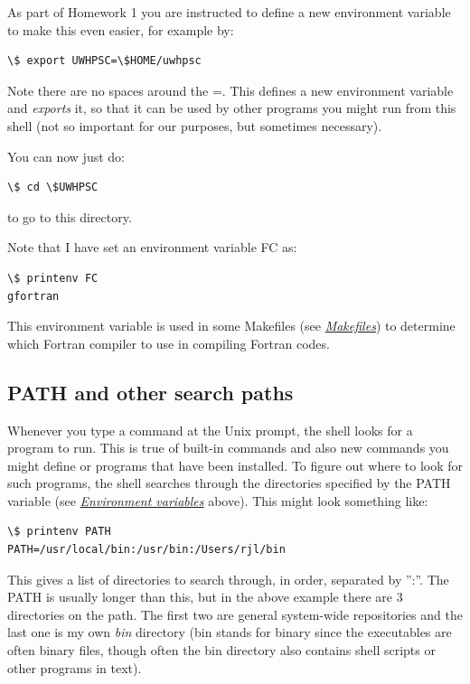 \documentclass[letterpaper,10pt,english]{sphinxmanual}
\begin{document}
As part of Homework 1 you are instructed to define a new environment
variable to make this even easier,  for example by:

\begin{Verbatim}[commandchars=\\\{\}]
\$ export UWHPSC=\$HOME/uwhpsc
\end{Verbatim}

Note there are no spaces around the =.   This defines a new environment
variable and \emph{exports} it, so that it can be used by other programs you
might run from this shell (not so important for our purposes, but sometimes
necessary).

You can now just do:

\begin{Verbatim}[commandchars=\\\{\}]
\$ cd \$UWHPSC
\end{Verbatim}

to go to this directory.

Note that I have set an environment variable FC as:

\begin{Verbatim}[commandchars=\\\{\}]
\$ printenv FC
gfortran
\end{Verbatim}

This environment variable is used in some Makefiles (see {\hyperref[makefiles:makefiles]{\emph{Makefiles}}})
to determine which Fortran compiler to use in compiling Fortran codes.


\subsection{PATH and other search paths}
\label{unix:path-and-other-search-paths}\label{unix:unix-path}
Whenever you type a command at the Unix prompt, the shell looks for a
program to run.  This is true of built-in commands and also new commands you
might define or programs that have been installed.  To figure out where to
look for such programs, the shell searches through the directories specified
by the PATH variable (see {\hyperref[unix:env]{\emph{Environment variables}}} above).  This might look something
like:

\begin{Verbatim}[commandchars=\\\{\}]
\$ printenv PATH
PATH=/usr/local/bin:/usr/bin:/Users/rjl/bin
\end{Verbatim}

This gives a list of directories to search through, in order, separated by
'':''.   The PATH is usually longer than this, but in the above example there
are 3 directories on the path.  The first two are general system-wide
repositories and the last one is my own \emph{bin} directory (bin stands for
binary since the executables are often binary files, though often the bin
directory also contains shell scripts or other programs in text).
\end{document}
